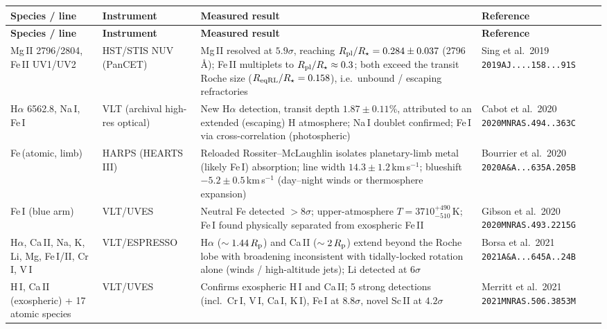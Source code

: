 \begingroup
\setlength{\tabcolsep}{4pt}
\renewcommand{\arraystretch}{1.15}
\begin{longtable}{@{}>{\raggedright\arraybackslash}p{2.4cm}>{\raggedright\arraybackslash}p{2.3cm}>{\raggedright\arraybackslash}p{5.0cm}>{\raggedright\arraybackslash}p{3.2cm}@{}}
\toprule
\textbf{Species / line} & \textbf{Instrument} & \textbf{Measured result} & \textbf{Reference} \\
\midrule
\endfirsthead
\toprule
\textbf{Species / line} & \textbf{Instrument} & \textbf{Measured result} & \textbf{Reference} \\
\midrule
\endhead
\bottomrule
\endfoot
Mg\,II 2796/2804, Fe\,II UV1/UV2 & HST/STIS NUV (PanCET) &
Mg\,II resolved at $5.9\sigma$, reaching $R_{\rm pl}/R_{\star}=0.284\pm0.037$
(2796\,\AA); Fe\,II multiplets to $R_{\rm pl}/R_{\star}\approx0.3$; both exceed
the transit Roche size ($R_{\rm eqRL}/R_{\star}=0.158$), i.e.\ unbound /
escaping refractories &
Sing et al.\ 2019 \texttt{2019AJ....158...91S} \\
H$\alpha$ 6562.8, Na\,I, Fe\,I & VLT (archival high-res optical) &
New H$\alpha$ detection, transit depth $1.87\pm0.11\%$, attributed to an
extended (escaping) H atmosphere; Na\,I doublet confirmed; Fe\,I via
cross-correlation (photospheric) &
Cabot et al.\ 2020 \texttt{2020MNRAS.494..363C} \\
Fe\,(atomic, limb) & HARPS (HEARTS III) &
Reloaded Rossiter--McLaughlin isolates planetary-limb metal (likely Fe\,I)
absorption; line width $14.3\pm1.2$\,km\,s$^{-1}$; blueshift $-5.2\pm0.5$\,km\,s$^{-1}$
(day--night winds or thermosphere expansion) &
Bourrier et al.\ 2020 \texttt{2020A\&A...635A.205B} \\
Fe\,I (blue arm) & VLT/UVES &
Neutral Fe detected $>8\sigma$; upper-atmosphere $T=3710^{+490}_{-510}$\,K;
Fe\,I found physically separated from exospheric Fe\,II &
Gibson et al.\ 2020 \texttt{2020MNRAS.493.2215G} \\
H$\alpha$, Ca\,II, Na, K, Li, Mg, Fe\,I/II, Cr\,I, V\,I & VLT/\allowbreak ESPRESSO &
H$\alpha$ ($\sim1.44\,R_{\rm p}$) and Ca\,II ($\sim2\,R_{\rm p}$) extend beyond
the Roche lobe with broadening inconsistent with tidally-locked rotation
alone (winds / high-altitude jets); Li detected at $6\sigma$ &
Borsa et al.\ 2021 \texttt{2021A\&A...645A..24B} \\
H\,I, Ca\,II (exospheric) + 17 atomic species & VLT/UVES &
Confirms exospheric H\,I and Ca\,II; 5 strong detections (incl.\ Cr\,I, V\,I,
Ca\,I, K\,I), Fe\,I at $8.8\sigma$, novel Sc\,II at $4.2\sigma$ &
Merritt et al.\ 2021 \texttt{2021MNRAS.506.3853M} \\

\end{longtable}
